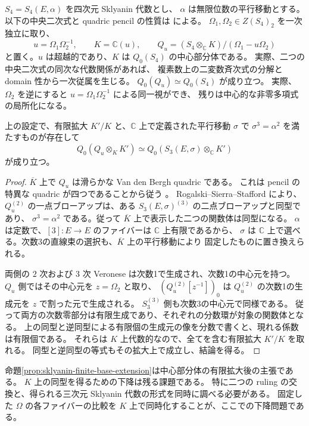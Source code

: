 $S_4=S_4(E,\alpha)$ を四次元 Sklyanin 代数とし、
$\alpha$ は無限位数の平行移動とする。
以下の中央二次式と quadric pencil の性質は
\cite[\S10.1--10.4、定理10.2]{SmithVdB} による。
$\Omega_1,\Omega_2\in Z(S_4)_2$ を一次独立に取り、
\[
 u=\Omega_1\Omega_2^{-1},\qquad K=\mathbb C(u),\qquad
 Q_u=(S_4\otimes_{\mathbb C}K)/(\Omega_1-u\Omega_2)
\]
と置く。$u$ は超越的であり、$K$ は $Q_0(S_4)$ の中心部分体である。
実際、二つの中央二次式の同次な代数関係があれば、
複素数上の二変数斉次式の分解と domain 性から一次従属を生じる。
$Q_0(Q_u)\simeq Q_0(S_4)$ が成り立つ。
実際、$\Omega_2$ を逆にすると $u=\Omega_1\Omega_2^{-1}$ による同一視ができ、
残りは中心的な非零多項式の局所化になる。

\begin{proposition}\label{prop:sklyanin-finite-base-extension}
上の設定で、有限拡大 $K'/K$ と、$\mathbb C$ 上で定義された平行移動
$\sigma$ で $\sigma^3=\alpha^2$ を満たすものが存在して
\[
 Q_0(Q_u\otimes_KK')
 \simeq
 Q_0(S_3(E,\sigma)\otimes_{\mathbb C}K')
\]
が成り立つ。
\end{proposition}
\begin{proof}
$\overline K$ 上で $Q_u$ は滑らかな Van den Bergh quadric である。
これは pencil の特異な quadric が四つであることから従う
\cite[定理10.2]{SmithVdB}。
Rogalski--Sierra--Stafford \cite[定理1.2、定理7.3]{RSS2023} により、
$Q_u^{(2)}$ の一点ブローアップは、ある $S_3(E,\sigma)^{(3)}$ の二点ブローアップと同型であり、
$\sigma^3=\alpha^2$ である。従って $\overline K$ 上で表示した二つの関数体は同型になる。
$\alpha$ は定数で、$[3]\colon E\to E$ のファイバーは $\mathbb C$ 上有限であるから、
$\sigma$ は $\mathbb C$ 上で選べる。次数3の直線束の選択も、$\overline K$ 上の平行移動により
固定したものに置き換えられる。

両側の $2$ 次および $3$ 次 Veronese は次数1で生成され、次数1の中心元を持つ。
$Q_u$ 側ではその中心元を $z=\Omega_2$ と取り、
$(Q_u^{(2)}[z^{-1}])_0$ は $Q_u^{(2)}$ の次数1の生成元を $z$ で割った元で生成される。
$S_3^{(3)}$ 側も次数3の中心元で同様である。
従って両方の次数零部分は有限生成であり、それぞれの分数環が対象の関数体となる。
上の同型と逆同型による有限個の生成元の像を分数で書くと、現れる係数は有限個である。
それらは $K$ 上代数的なので、全てを含む有限拡大 $K'/K$ を取れる。
同型と逆同型の等式もその拡大上で成立し、結論を得る。
\end{proof}

命題\ref{prop:sklyanin-finite-base-extension}は中心部分体の有限拡大後の主張である。
$K$ 上の同型を得るための下降は残る課題である。
特に二つの ruling の交換と、得られる三次元 Sklyanin 代数の形式を同時に調べる必要がある。
固定した $\Omega$ の各ファイバーの比較を $K$ 上で同時化することが、ここでの下降問題である。
